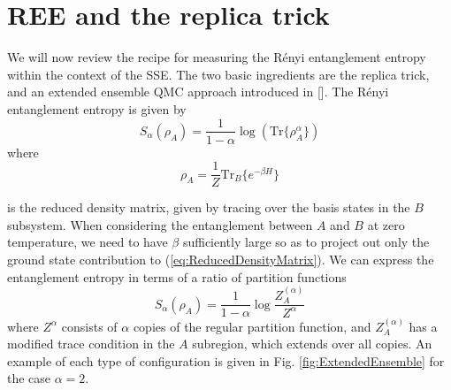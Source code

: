 \documentclass[aps,prb,reprint,floatfix]{revtex4-1}
\begin{document}
\section{REE and the replica trick}\label{app_c}
We will now review the recipe for measuring the R\'{e}nyi entanglement entropy within the context of the SSE.  The two basic ingredients are the replica trick, \cite{Melko2010:FiniteTRenyi,Hastings2010:MeasuringRenyiQMC} and an extended ensemble QMC approach introduced in [].  The R\'{e}nyi entanglement entropy is given by
{\allowdisplaybreaks
\begin{equation}
		S_{\alpha}(\rho_{A})= \frac{1}{1-\alpha}\log(\text{Tr}\{ \rho^{\alpha}_{A} \})
\label{eq:RenyiEntropy1}
\end{equation}}
where
{\allowdisplaybreaks
\begin{equation}
		\rho_{A}=\frac{1}{Z}\text{Tr}_{B}\{ e^{-\beta H} \}
\label{eq:ReducedDensityMatrix}
\end{equation}}


is the reduced density matrix, given by tracing over the basis states in the $B$ subsystem.  When considering the entanglement between $A$ and $B$ at zero temperature, we need to have $\beta$ sufficiently large so as to project out only the ground state contribution to (\ref{eq:ReducedDensityMatrix}).  We can express the entanglement entropy in terms of a ratio of partition functions\cite{Humeniuk2012:ExtendedEnsemble}
\begin{equation}
S_{\alpha}(\rho_{A})= \frac{1}{1-\alpha}\log\frac{Z^{(\alpha)}_{A}}{Z^{\alpha}}
\label{eq:RenyiEntropy2}
\end{equation}
where $Z^{\alpha}$ consists of $\alpha$ copies of the regular partition function, and $Z^{(\alpha)}_{A}$ has a modified trace condition in the $A$ subregion, which extends over all copies.  An example of each type of configuration is given in Fig. \ref{fig:ExtendedEnsemble} for the case $\alpha=2$.  
\end{document}
